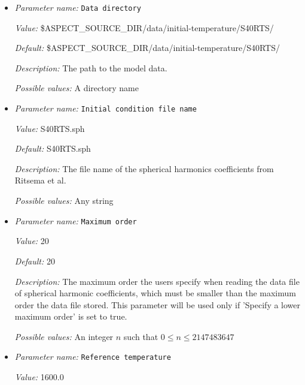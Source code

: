 \begin{itemize}
\item {\it Parameter name:} {\tt Data directory}
\label{parameters:Initial temperature model/S40RTS perturbation/Data directory}


{\it Value:} \$ASPECT\_SOURCE\_DIR/data/initial-temperature/S40RTS/


{\it Default:} \$ASPECT\_SOURCE\_DIR/data/initial-temperature/S40RTS/


{\it Description:} The path to the model data. 


{\it Possible values:} A directory name
\item {\it Parameter name:} {\tt Initial condition file name}
\label{parameters:Initial temperature model/S40RTS perturbation/Initial condition file name}


{\it Value:} S40RTS.sph


{\it Default:} S40RTS.sph


{\it Description:} The file name of the spherical harmonics coefficients from Ritsema et al.


{\it Possible values:} Any string
\item {\it Parameter name:} {\tt Maximum order}
\label{parameters:Initial temperature model/S40RTS perturbation/Maximum order}


{\it Value:} 20


{\it Default:} 20


{\it Description:} The maximum order the users specify when reading the data file of spherical harmonic coefficients, which must be smaller than the maximum order the data file stored. This parameter will be used only if 'Specify a lower maximum order' is set to true.


{\it Possible values:} An integer $n$ such that $0\leq n \leq 2147483647$
\item {\it Parameter name:} {\tt Reference temperature}
\label{parameters:Initial temperature model/S40RTS perturbation/Reference temperature}


{\it Value:} 1600.0



\end{itemize}
